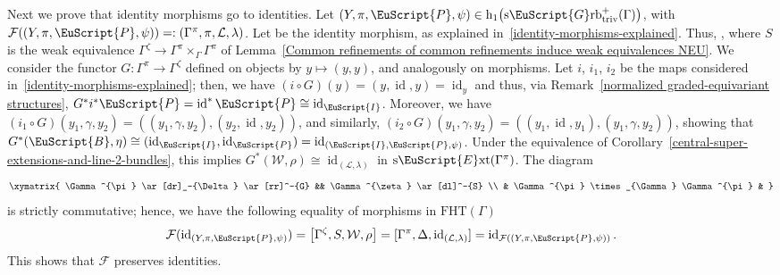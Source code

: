 \documentclass[10pt,a4paper]{amsart}
\numberwithin{equation}{section}
\def\mathscr#1{\EuScript{#1}}
\def\hc#1{\mathrm{h}_{#1}}
\newcommand{\id}{\operatorname{id}}
\newcommand{\Grbtriv}{\mathscr{G}\mathrm{rb}_{\mathrm{triv}}}
\newcommand{\sGrbtriv}{\mathrm{s}\Grbtriv}
\def\sExt{\normalfont\text{s}\mathscr{E}\text{xt}}
\begin{document}
 Next we prove that identity morphisms go to identities.
 Let $(Y,\pi,\mathscr{P},\psi)\in \hc 1\bigl(\sGrbtriv^{+}(\Gamma)\bigr)$, with $\mathcal{F}((Y,\pi,\mathscr{P},\psi))=:(\Gamma^\pi,\pi,\mathcal{L},\lambda)$. Let \smash{$\id_{(Y,\pi,\mathscr{P},\psi)}= (Z,\zeta,\mathscr{B},\eta)$} be the identity morphism, as explained in~\ref{identity-morphisms-explained}.
Thus, \smash{$\mathcal{F}(\id_{(Y,\pi,\mathscr{P},\psi)})=\big[\Gamma^{\zeta},S,\mathcal{W},\rho\big]$}, where $S$ is the weak equivalence $\Gamma^{\zeta} \to \Gamma^\pi \times_{\Gamma} \Gamma^{\pi}$ of Lemma~\ref{Common refinements of common refinements induce weak equivalences NEU}. We consider the functor $G\colon \Gamma^{\pi} \to \Gamma^{\zeta}$ defined on objects by $y \mapsto (y,y)$, and analogously on morphisms. Let $i$, $i_1$, $i_2$ be the maps
considered in~\ref{identity-morphisms-explained}; then, we have $(i \circ G)(y)=(y,\id,y)=\id_y$ and thus, via Remark~\ref{normalized graded-equivariant structures}, $G^{*}i^{*}\mathscr{P}=\id^{*}\mathscr{P}\cong \id_{\mathscr{I}}$. Moreover, we have $(i_1 \circ G)(y_1,\gamma,y_2) =((y_1,\gamma,y_2),(y_2,\id,y_2))$, and similarly, $(i_2 \circ G)(y_1,\gamma,y_2) =((y_1,\id,y_1),(y_1,\gamma,y_2))$, showing that
$
G^{*}(\mathscr{B},\eta)\cong (\id_{\mathscr{I}},\id_{\mathscr{P}})=\id_{(\mathscr{I},\mathscr{P},\psi)}$.
Under the equivalence of Corollary~\ref{central-super-extensions-and-line-2-bundles}, this implies $G^{*}(\mathcal{W},\rho) \cong \id_{(\mathcal{L},\lambda)}$ in $\sExt(\Gamma^{\pi})$. The diagram
 \begin{equation*}
 \xymatrix{
 \Gamma^{\pi} \ar[dr]_-{\Delta} \ar[rr]^-{G} && \Gamma^{\zeta} \ar[dl]^-{S} \\
 & \Gamma^{\pi} \times_{\Gamma} \Gamma^{\pi} &
 }
 \end{equation*}
is strictly commutative; hence, we have the following equality of morphisms in $\mathrm{FHT}(\Gamma)$
\begin{equation*}
\mathcal{F}(\id_{(Y,\pi,\mathscr{P},\psi)})=\big[\Gamma^{\zeta},S,\mathcal{W},\rho\big]=[\Gamma^{\pi},\Delta,\id_{(\mathcal{L},\lambda)}]=\id_{\mathcal{F}((Y,\pi,\mathscr{P},\psi))}.
\end{equation*}
This shows that $\mathcal{F}$ preserves identities.
\end{document}
